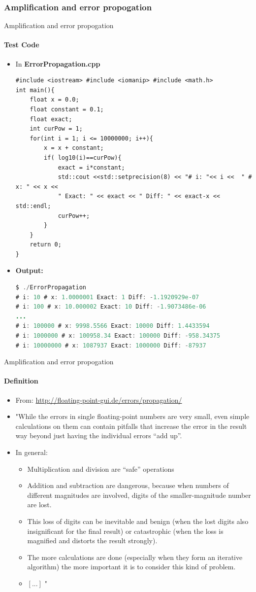 \documentclass[9pt,pdftex]{beamer}
\begin{document}
\subsubsection{Amplification and error propogation}
\begin{frame}[fragile]{Amplification and error propogation}
\framesubtitle{Test Code}
\begin{itemize}
\item[] In \textbf{ErrorPropagation.cpp}
\scriptsize{
\begin{lstlisting} 
#include <iostream> #include <iomanip> #include <math.h> 
int main(){
    float x = 0.0;
    float constant = 0.1;
    float exact;
    int curPow = 1;
    for(int i = 1; i <= 10000000; i++){
        x = x + constant;
        if( log10(i)==curPow){
            exact = i*constant;
            std::cout <<std::setprecision(8) << "# i: "<< i <<  " # x: " << x << 
            " Exact: " << exact << " Diff: " << exact-x << std::endl;
            curPow++;
        }	
    }
    return 0;
}
\end{lstlisting}
}
\item[] \textbf{Output:}
\begin{lstlisting}[language=java]
$ ./ErrorPropagation 
# i: 10 # x: 1.0000001 Exact: 1 Diff: -1.1920929e-07
# i: 100 # x: 10.000002 Exact: 10 Diff: -1.9073486e-06
...
# i: 100000 # x: 9998.5566 Exact: 10000 Diff: 1.4433594
# i: 1000000 # x: 100958.34 Exact: 100000 Diff: -958.34375
# i: 10000000 # x: 1087937 Exact: 1000000 Diff: -87937
\end{lstlisting}
\end{itemize}
\end{frame}

\begin{frame}[fragile]{Amplification and error propogation}
\framesubtitle{Definition}
\begin{itemize}
\item From: \url{http://floating-point-gui.de/errors/propagation/}
\item[] "While the errors in single floating-point numbers are very small, even simple calculations on them can contain pitfalls that increase the error in the result way beyond just having the individual errors “add up”.
\item[] In general:
\begin{itemize}
\item Multiplication and division are “safe” operations
\item Addition and subtraction are dangerous, because when numbers of different magnitudes are involved, digits of the smaller-magnitude number are lost.
\item This loss of digits can be inevitable and benign (when the lost digits also insignificant for the final result) or catastrophic (when the loss is magnified and distorts the result strongly).
\item The more calculations are done (especially when they form an iterative algorithm) the more important it is to consider this kind of problem.
\item $[...]$ "
\end{itemize}
\end{itemize}
\end{frame}
\end{document}
